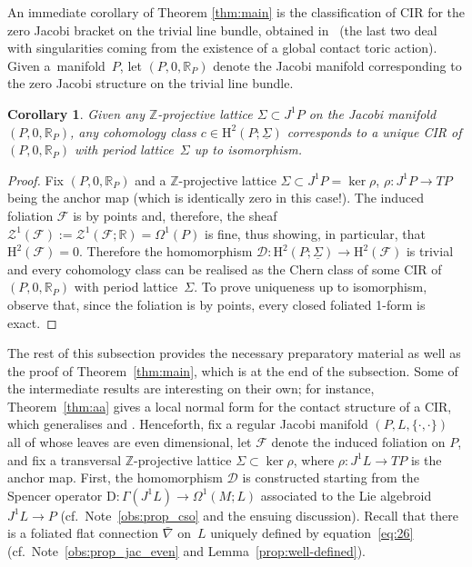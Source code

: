 \documentclass[10pt,a4paper]{amsart}
\numberwithin{equation}{section}
\newtheorem{Corollary}[Theorem]{Corollary}
\newcommand{\JM}{(P,L,\{\cdot,\cdot\})} %
\newcommand{\HH}{\mathrm{H}}
\newcommand{\RR}{\mathbb{R}}
\newcommand{\ZZ}{\mathbb{Z}}
\begin{document}
An immediate corollary of Theorem \ref{thm:main} is the classif\/ication of CIR for the zero Jacobi bracket on the trivial line bundle, obtained in~\cite{Banyaga,lerman_contact_toric,wolbert} (the last two deal with singularities coming from the existence of a global contact toric action). Given a~manifold~$P$, let $(P,0,\RR_{P})$ denote the Jacobi manifold corresponding to the zero Jacobi structure on the trivial line bundle.

\begin{Corollary}\label{cor:zero}
 Given any $\ZZ$-projective lattice $\Sigma \subset J^1P$ on the Jacobi manifold $(P,0,\RR_P)$, any cohomology class $c \in \HH^2(P;\underline{\Sigma})$ corresponds to a unique CIR of $(P,0,\RR_{P})$ with period lat\-ti\-ce~$\Sigma$ up to isomorphism.
\end{Corollary}

\begin{proof} Fix $(P,0,\RR_{P})$ and a $\ZZ$-projective lattice $\Sigma \subset J^1 P = \ker \rho$, $\rho \colon J^1 P \to TP$ being the anchor map (which is identically zero in this case!). The induced foliation $\mathcal{F}$ is by points and, therefore, the sheaf $\mathcal{Z}^1(\mathcal{F}):= \mathcal{Z}^1(\mathcal{F};\RR) = \Omega^1(P)$ is f\/ine, thus showing, in particular, that $\HH^2(\mathcal{F}) = 0$. Therefore the homomorphism $\mathcal{D} \colon \HH^2(P;\underline{\Sigma}) \to \HH^2(\mathcal{F})$ is trivial and every cohomology class can be realised as the Chern class of some CIR of~$(P,0,\RR_{P})$ with period lattice~$\Sigma$. To prove uniqueness up to isomorphism, observe that, since the foliation is by points, every closed foliated 1-form is exact.
\end{proof}

The rest of this subsection provides the necessary preparatory material as well as the proof of Theorem~\ref{thm:main}, which is at the end of the subsection. Some of the intermediate results are interesting on their own; for instance, Theorem~\ref{thm:aa} gives a local normal form for the contact structure of a CIR, which generalises \cite[Theorem~1]{Banyaga} and \cite[Theorems~4 and~5]{jovanovic}. Henceforth, f\/ix a regular Jacobi manifold $\JM$ all of whose leaves are even dimensional, let $\mathcal{F}$ denote the induced foliation on $P$, and f\/ix a transversal $\ZZ$-projective lattice
$\Sigma \subset \ker \rho$, where $\rho \colon J^1 L \to TP$ is the anchor map. First, the homomorphism $\mathcal{D}$ is constructed starting from the Spencer operator $\mathrm{D} \colon \Gamma(J^1L) \to \Omega^1(M;L)$ associated to the Lie algebroid $J^1L \to P$ (cf.\ Note~\ref{obs:prop_cso} and the ensuing discussion). Recall that there is a foliated f\/lat connection $\bar\nabla$ on~$L$ uniquely def\/ined by equation~\eqref{eq:26} (cf.\ Note~\ref{obs:prop_jac_even} and Lemma~\ref{prop:well-defined}).
\end{document}
